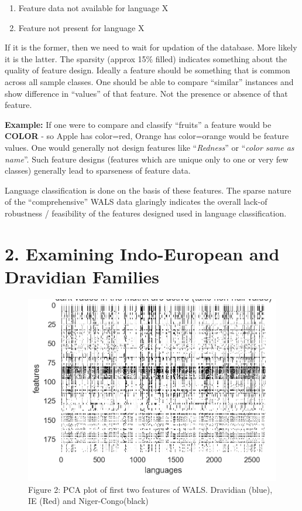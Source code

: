 \begin{enumerate}[{\rm 1)}]
\itemsep=0pt
\item Feature data not available for language X

 \item Feature not present for language X

\end{enumerate}

If it is the former, then we need to wait for updation of the database. More likely it is the latter. The sparsity (approx 15\% filled) indicates something about the quality of feature design. Ideally a feature should be something that is common across all sample classes. One should be able to compare “similar” instances and show difference in “values” of that feature. Not the presence or absence of that feature.

\textbf{Example:} If one were to compare and classify “fruits” a feature would be \textbf{COLOR} - so Apple has {color=red}, Orange has {color=orange} would be feature values. One would generally not design features like “\textit{Redness}” or “\textit{color same as name}”. Such feature designs (features which are unique only to one or very few classes) generally lead to sparseness of feature data.

Language classification is done on the basis of these features. The sparse nature of the “comprehensive” WALS data glaringly indicates the overall lack-of robustness / feasibility of the features designed used in language classification.

\section{2. Examining Indo-European and Dravidian Families}

\begin{figure}
\caption{Figure 2: PCA plot of first two features of WALS. Dravidian (blue), IE (Red) and Niger-Congo(black)}
\includegraphics{"images/6-02.jpg"}
\end{figure}

